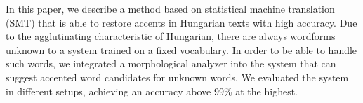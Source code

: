 In this paper, we describe a method based on statistical machine translation (SMT) that is able to restore accents in Hungarian texts with high accuracy. Due to the agglutinating characteristic of Hungarian, there are always wordforms unknown to a system trained on a fixed vocabulary. In order to be able to handle such words, we integrated a morphological analyzer into the system that can suggest accented word candidates for unknown words. We evaluated the system in different setups, achieving an accuracy above 99\% at the highest.
